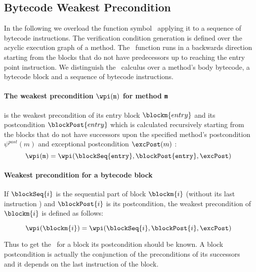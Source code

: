 

\subsection{Bytecode Weakest Precondition}\label{wpGraph}

In the following we overload the function symbol \wpi \ applying it to a sequence of bytecode instructions.
 The verification condition generation is defined over the acyclic execution graph of a method. 
The \wpi \ function runs in a backwards direction starting from the blocks that do not have predecessors up to reaching the entry point
 instruction. We distinguish the \wpi \ calculus over  a method's body bytecode, a bytecode block and a sequence of bytecode instructions.

\paragraph{The weakest precondition $\wpi(\tt{m})$ for method \texttt{m}}  is the weakest precondition of its entry block $\blockm{entry}$ and its postcondition $\blockPost{entry}$ which is calculated recursively starting from the blocks that do not have successors upon the specified method's postcondition  $\psi^{post}(m)$ and exceptional postcondition $\excPost (m)$ :
 $$\wpi(\tt{m}) = \wpi(\blockSeq{entry}, \blockPost{entry}, \excPost ) $$


\paragraph{Weakest precondition for a bytecode block} If $\blockSeq{i}$ is the sequential part of block $\blockm{i}$ (without its last instruction ) and  $\blockPost{i}$ is its postcondition, the weakest precondition of $\blockm{i}$ is defined as follows:

$$ \wpi(\blockm{i}) = \wpi( \blockSeq{i}, \blockPost{i}, \excPost ) $$
 
Thus to get the \wpi \ for a block its postcondition should be known. A block postcondition is actually the conjunction of the preconditions
of its successors and it depends on the last instruction of the block.

